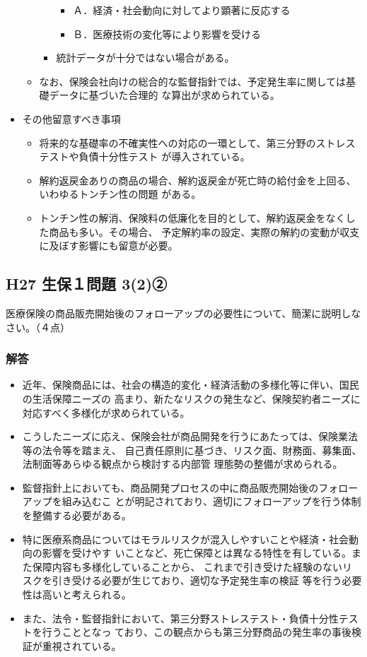 \documentclass[report,gutter=10mm,fore-edge=10mm,uplatex,dvipdfmx]{jlreq}
\begin{document}
\begin{itemize}
\begin{itemize}
\begin{itemize}
\begin{itemize}
 \item Ａ．経済・社会動向に対してより顕著に反応する
 \item Ｂ．医療技術の変化等により影響を受ける
\end{itemize}
 \item  統計データが十分ではない場合がある。
\end{itemize}
 \item  なお、保険会社向けの総合的な監督指針では、予定発生率に関しては基礎データに基づいた合理的
な算出が求められている。
\end{itemize}
 \item その他留意すべき事項
\begin{itemize} 
 \item 将来的な基礎率の不確実性への対応の一環として、第三分野のストレステストや負債十分性テスト が導入されている。
 \item  解約返戻金ありの商品の場合、解約返戻金が死亡時の給付金を上回る、いわゆるトンチン性の問題 がある。
 \item  トンチン性の解消、保険料の低廉化を目的として、解約返戻金をなくした商品も多い。その場合、
 予定解約率の設定、実際の解約の変動が収支に及ぼす影響にも留意が必要。
\end{itemize}
\end{itemize}

\subsection{H27 生保１問題 3(2)②}
医療保険の商品販売開始後のフォローアップの必要性について、簡潔に説明しなさい。（４点）

\subsubsection{解答}
\begin{itemize}
 \item  近年、保険商品には、社会の構造的変化・経済活動の多様化等に伴い、国民の生活保障ニーズの
		     高まり、新たなリスクの発生など、保険契約者ニーズに対応すべく多様化が求められている。
 \item  こうしたニーズに応え、保険会社が商品開発を行うにあたっては、保険業法等の法令等を踏まえ、
  自己責任原則に基づき、リスク面、財務面、募集面、法制面等あらゆる観点から検討する内部管
  理態勢の整備が求められる。
\item 監督指針上においても、商品開発プロセスの中に商品販売開始後のフォローアップを組み込むこ
  とが明記されており、適切にフォローアップを行う体制を整備する必要がある。
\item 特に医療系商品についてはモラルリスクが混入しやすいことや経済・社会動向の影響を受けやす
  いことなど、死亡保障とは異なる特性を有している。また保障内容も多様化していることから、
  これまで引き受けた経験のないリスクを引き受ける必要が生じており、適切な予定発生率の検証
  等を行う必要性は高いと考えられる。
\item また、法令・監督指針において、第三分野ストレステスト・負債十分性テストを行うこととなっ
 ており、この観点からも第三分野商品の発生率の事後検証が重視されている。
\end{itemize}
\end{document}
